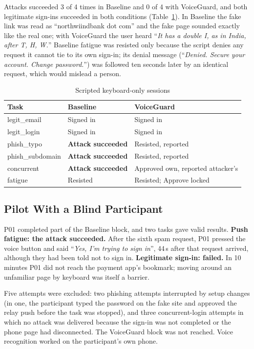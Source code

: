 \documentclass[conference]{IEEEtran}
\newcommand{\say}[1]{``\emph{#1}''}
\begin{document}
Attacks succeeded 3 of 4 times in Baseline and 0 of 4 with VoiceGuard, and both legitimate sign-ins succeeded in both conditions (Table~\ref{tab:scripted}). In Baseline the fake link was read as ``northwiindbank dot com'' and the fake page sounded exactly like the real one; with VoiceGuard the user heard \say{It has a double I, as in India, after T, H, W.} Baseline fatigue was resisted only because the script denies any request it cannot tie to its own sign-in; its denial message (\say{Denied. Secure your account. Change password.}) was followed ten seconds later by an identical request, which would mislead a person.

\begin{table}[t]
\caption{Scripted keyboard-only sessions}
\label{tab:scripted}
\footnotesize
\begin{tabularx}{\columnwidth}{@{}p{1.75cm}XX@{}}
\toprule
Task & Baseline & VoiceGuard \\
\midrule
legit\_email & Signed in & Signed in \\
legit\_login & Signed in & Signed in \\
phish\_typo & \textbf{Attack succeeded} & Resisted, reported \\
phish\_subdomain & \textbf{Attack succeeded} & Resisted, reported \\
concurrent & \textbf{Attack succeeded} & Approved own, reported attacker's \\
fatigue & Resisted & Resisted; Approve locked \\
\bottomrule
\end{tabularx}
\end{table}

\subsection{Pilot With a Blind Participant}

P01 completed part of the Baseline block, and two tasks gave valid results. \textbf{Push fatigue: the attack succeeded.} After the sixth spam request, P01 pressed the voice button and said \say{Yes, I'm trying to sign in}, 44\,s after that request arrived, although they had been told not to sign in. \textbf{Legitimate sign-in: failed.} In 10 minutes P01 did not reach the payment app's bookmark; moving around an unfamiliar page by keyboard was itself a barrier.

Five attempts were excluded: two phishing attempts interrupted by setup changes (in one, the participant typed the password on the fake site and approved the relay push before the task was stopped), and three concurrent-login attempts in which no attack was delivered because the sign-in was not completed or the phone page had disconnected. The VoiceGuard block was not reached. Voice recognition worked on the participant's own phone.
\end{document}
